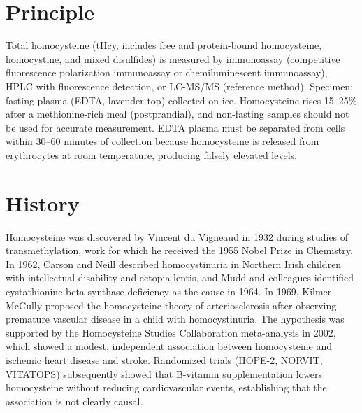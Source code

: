 \section*{Principle}
Total homocysteine (tHcy, includes free and protein-bound homocysteine, homocystine, and mixed disulfides) is measured by immunoassay (competitive fluorescence polarization immunoassay or chemiluminescent immunoassay), HPLC with fluorescence detection, or LC-MS/MS (reference method). Specimen: fasting plasma (EDTA, lavender-top) collected on ice. Homocysteine rises 15--25\% after a methionine-rich meal (postprandial), and non-fasting samples should not be used for accurate measurement. EDTA plasma must be separated from cells within 30--60 minutes of collection because homocysteine is released from erythrocytes at room temperature, producing falsely elevated levels.
\section*{History}
Homocysteine was discovered by Vincent du Vigneaud in 1932 during studies of transmethylation, work for which he received the 1955 Nobel Prize in Chemistry. In 1962, Carson and Neill described homocystinuria in Northern Irish children with intellectual disability and ectopia lentis, and Mudd and colleagues identified cystathionine beta-synthase deficiency as the cause in 1964. In 1969, Kilmer McCully proposed the homocysteine theory of arteriosclerosis after observing premature vascular disease in a child with homocystinuria. The hypothesis was supported by the Homocysteine Studies Collaboration meta-analysis in 2002, which showed a modest, independent association between homocysteine and ischemic heart disease and stroke. Randomized trials (HOPE-2, NORVIT, VITATOPS) subsequently showed that B-vitamin supplementation lowers homocysteine without reducing cardiovascular events, establishing that the association is not clearly causal.
